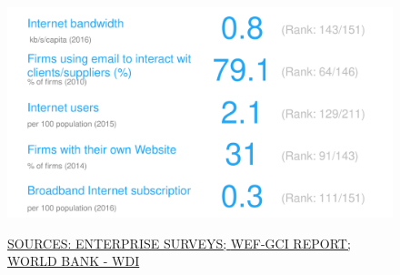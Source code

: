 \documentclass{article}\usepackage[]{graphicx}\usepackage[]{color}
\makeatletter
\def\maxwidth{ %
  \ifdim\Gin@nat@width>\linewidth
    \linewidth
  \else
    \Gin@nat@width
  \fi
}
\makeatother
\begin{document}
\begin{figure}
\begin{minipage}[c]{0.95\textwidth}
\begin{minipage}[b]{0.95\textwidth}
\begin{minipage}[c]{0.49\textwidth}
{\centering \includegraphics[width=\maxwidth]{figure/number_chart_Markets-1} 

}



      \vspace{2ex}
      \hspace{4ex}\scriptsize{\href{http://www.enterprisesurveys.org/data/exploretopics/innovation-and-technology}{\textcolor[HTML]{22A6F5}{SOURCES: ENTERPRISE SURVEYS; }}\href{http://www3.weforum.org/docs/gcr/2015-2016/GCI_Dataset_2006-2015.xlsx}{\textcolor[HTML]{22A6F5}{WEF-GCI REPORT; }}\href{http://data.worldbank.org}{\textcolor[HTML]{22A6F5}{WORLD BANK - WDI}}}
    \end{minipage}
  \end{minipage}  
  


\end{minipage}
\end{figure}
\end{document}
